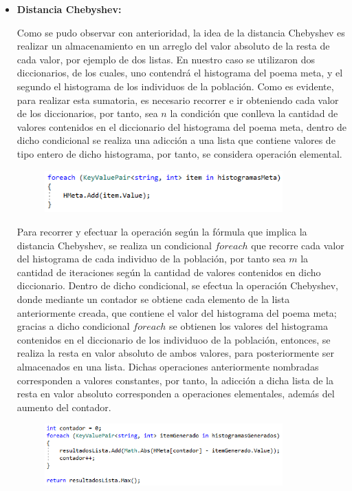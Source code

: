 \documentclass[journal]{IEEEtran}
\begin{document}
\begin{itemize}
	
	\item{\bf Distancia Chebyshev:}

	Como se pudo observar con anterioridad, la idea de la distancia Chebyshev es realizar un almacenamiento en un arreglo del valor absoluto de la resta de cada valor, por ejemplo de dos listas.
	En nuestro caso se utilizaron dos diccionarios, de los cuales, uno contendrá el histograma del poema meta, y el segundo el histograma de los individuos de la población.
	Como es evidente, para realizar esta sumatoria, es necesario recorrer e ir obteniendo cada valor de los diccionarios, por tanto, sea $ n $ la condición que conlleva la cantidad de valores contenidos
	en el diccionario del histograma del poema meta, dentro de dicho condicional se realiza una adicción a una lista que contiene valores de tipo entero de dicho histograma, por tanto, se considera operación elemental.
	
	\begin{figure}[h]
		\centering
		\includegraphics[width = 260pt]{Manhattan1.png}
		\caption{ }
	\end{figure}
	
	Para recorrer y efectuar la operación según la fórmula que implica la distancia Chebyshev, se realiza un condicional $ foreach $ que recorre cada valor del histograma de cada individuo de la población,
	por tanto sea $ m $ la cantidad de iteraciones según la cantidad de valores contenidos en dicho diccionario. Dentro de dicho condicional, se efectua la operación Chebyshev, donde mediante un contador
	se obtiene cada elemento de la lista anteriormente creada, que contiene el valor del histograma del poema meta; gracias a dicho condicional $ foreach $ se obtienen los valores del histograma contenidos en el
	diccionario de los individuoo de la población, entonces, se realiza la resta en valor absoluto de ambos valores, para posteriormente ser almacenados en una lista. Dichas operaciones anteriormente nombradas
	corresponden a valores constantes, por tanto, la adicción a dicha lista de la resta en valor absoluto corresponden a operaciones elementales, además del aumento del contador.
	
	\begin{figure}[h]
		\centering
		\includegraphics[width = 260pt]{Chebyshev2.png}
		\caption{ }
	\end{figure}
	

\end{itemize}
\end{document}
